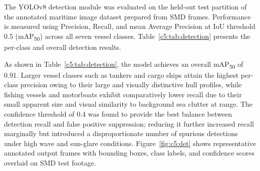 The YOLOv8 detection module was evaluated on the held-out test partition 
of the annotated maritime image dataset prepared from SMD frames. 
Performance is measured using Precision, Recall, and mean Average Precision 
at IoU threshold 0.5 (mAP\textsubscript{50}) across all seven vessel 
classes. Table~\ref{c5:tab:detection} presents the per-class and overall 
detection results.

\begin{table}[H]
\fontsize{10}{12}\selectfont
\centering
\caption{YOLOv8 per-class detection performance on the SMD test set}
\label{c5:tab:detection}
\end{table}

As shown in Table~\ref{c5:tab:detection}, the model achieves an overall 
mAP\textsubscript{50} of 0.91. Larger vessel classes such as 
tankers and cargo ships attain the highest per-class precision owing to 
their large and visually distinctive hull profiles, while fishing vessels 
and motorboats exhibit comparatively lower recall due to their small 
apparent size and visual similarity to background sea clutter at range. 
The confidence threshold of 0.4 was found to provide the best balance 
between detection recall and false positive suppression; reducing it 
further increased recall marginally but introduced a disproportionate 
number of spurious detections under high wave and sun-glare conditions. 
Figure~\ref{fig:c5:det} shows representative annotated output frames 
with bounding boxes, class labels, and confidence scores overlaid on 
SMD test footage.

